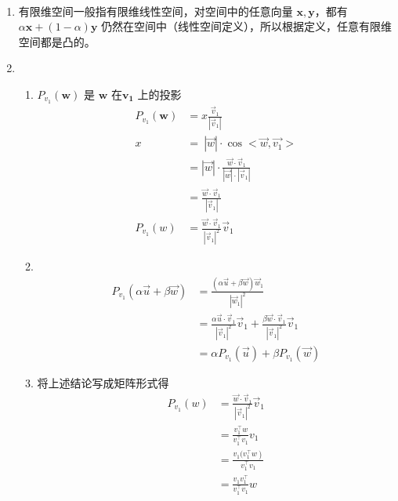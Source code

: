 \documentclass[11pt,letter,notitlepage]{article}
\begin{document}
\begin{solution}
	\heiti
	\ \\
	\begin{enumerate}
		\item 有限维空间一般指有限维线性空间，对空间中的任意向量 $\mathbf{x}, \mathbf{y}$，都有 $\alpha\mathbf{x} + (1-\alpha)\mathbf{y}$ 仍然在空间中（线性空间定义），所以根据定义，任意有限维空间都是凸的。
		\item \ \\
		\begin{enumerate}
			\item $P_{v_{1}}(\mathbf{w})$ 是 $\mathbf{w}$ 在$\mathbf{v_1}$ 上的投影
			\begin{align*}
				P_{v_{1}}(\mathbf{w}) &=x \frac{\vec{v}_{1}}{\left|\vec{v}_{1}\right|}  \\ 
				x \ &= \ |\vec{w}| \cdot \cos <\vec{w}, \overrightarrow{v_{1}}>\\
				&=|\vec{w}| \cdot \frac{\vec{w} \cdot \vec{v}_{1}}{|\vec{w}| \cdot\left|\vec{v}_{1}\right|} \\ 
				&=\frac{\vec{w} \cdot \vec{v}_{1}}{\left|\vec{v}_{1}\right|} \\ 
				P_{v_{1}}(w) &= \frac{\vec{w} \cdot \vec{v}_{1}}{\left|\vec{v}_{1}\right|^2} \vec{v}_{1}
			\end{align*}
			\item \ \\
				\begin{align*} 
				P_{v_{1}}(\alpha \vec{u}+\beta \vec{w}) &=\frac{(\alpha \vec{u}+\beta \vec{w}) \vec{w}_{1}}{\left|\vec{w}_{1}\right|^2} \\ &=\frac{\alpha \vec{u} \cdot \vec{v}_{1}}{\left|\vec{v}_{1}\right|^2} \vec{v}_{1}+\frac{\beta \vec{w} \cdot \vec{v}_{1}}{\left|\vec{v}_{1}\right|^2} \vec{v}_{1} \\ &=\alpha P_{v_{1}}(\vec{u})+\beta P_{v_{1}}(\vec{w}) 
				\end{align*}
			\item 将上述结论写成矩阵形式得\\
				\begin{align*} 
				P_{v_{1}}(w) &=\frac{\vec{w} \cdot \vec{v}_{1}}{\left|\vec{v}_{1}\right|^{2}} \vec{v}_{1} \\ &=\frac{v_{1}^{\top} w}{v_{1}^{\top} v_{1}} v_{1} \\ &=\frac{\left.v_{1} (v_{1}^{\top} w\right)}{v_{1}^{\top} v_{1}} \\ &=\frac{v_{1} v_{1}^{\top}}{v_{1}^{\top} v_{1}} w 
				\end{align*}

\end{enumerate}
\end{enumerate}
\end{solution}
\end{document}
